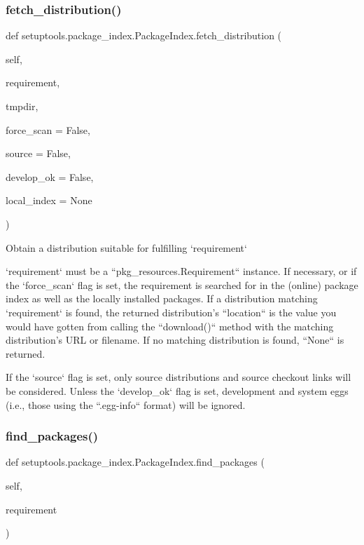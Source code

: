 \subsubsection{\texorpdfstring{fetch\+\_\+distribution()}{fetch\_distribution()}}
{\footnotesize\ttfamily def setuptools.\+package\+\_\+index.\+Package\+Index.\+fetch\+\_\+distribution (\begin{DoxyParamCaption}\item[{}]{self,  }\item[{}]{requirement,  }\item[{}]{tmpdir,  }\item[{}]{force\+\_\+scan = {\ttfamily False},  }\item[{}]{source = {\ttfamily False},  }\item[{}]{develop\+\_\+ok = {\ttfamily False},  }\item[{}]{local\+\_\+index = {\ttfamily None} }\end{DoxyParamCaption})}

\begin{DoxyVerb}Obtain a distribution suitable for fulfilling `requirement`

`requirement` must be a ``pkg_resources.Requirement`` instance.
If necessary, or if the `force_scan` flag is set, the requirement is
searched for in the (online) package index as well as the locally
installed packages.  If a distribution matching `requirement` is found,
the returned distribution's ``location`` is the value you would have
gotten from calling the ``download()`` method with the matching
distribution's URL or filename.  If no matching distribution is found,
``None`` is returned.

If the `source` flag is set, only source distributions and source
checkout links will be considered.  Unless the `develop_ok` flag is
set, development and system eggs (i.e., those using the ``.egg-info``
format) will be ignored.
\end{DoxyVerb}
 \mbox{\label{classsetuptools_1_1package__index_1_1PackageIndex_ac6b53cacdec1d717c42a4412cb0bc10f}} 
\subsubsection{\texorpdfstring{find\+\_\+packages()}{find\_packages()}}
{\footnotesize\ttfamily def setuptools.\+package\+\_\+index.\+Package\+Index.\+find\+\_\+packages (\begin{DoxyParamCaption}\item[{}]{self,  }\item[{}]{requirement }\end{DoxyParamCaption})}

